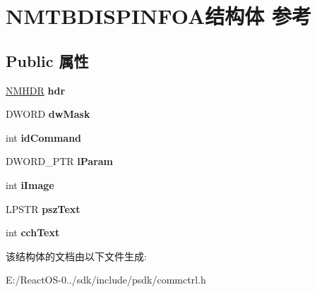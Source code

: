 \hypertarget{struct_n_m_t_b_d_i_s_p_i_n_f_o_a}{}\section{N\+M\+T\+B\+D\+I\+S\+P\+I\+N\+F\+O\+A结构体 参考}
\label{struct_n_m_t_b_d_i_s_p_i_n_f_o_a}
\subsection*{Public 属性}
\begin{DoxyCompactItemize}
\item 
\mbox{\label{struct_n_m_t_b_d_i_s_p_i_n_f_o_a_aab2fefe9cd6b92ec7bbbc17f71eddcc4}} 
\hyperlink{structtag_n_m_h_d_r}{N\+M\+H\+DR} {\bfseries hdr}
\item 
\mbox{\label{struct_n_m_t_b_d_i_s_p_i_n_f_o_a_a1a639f58fac80df2aa862d0d7d12638f}} 
D\+W\+O\+RD {\bfseries dw\+Mask}
\item 
\mbox{\label{struct_n_m_t_b_d_i_s_p_i_n_f_o_a_afd887f41e3255df88edcc1c6bb26b526}} 
int {\bfseries id\+Command}
\item 
\mbox{\label{struct_n_m_t_b_d_i_s_p_i_n_f_o_a_ad8b6ea3d08d44fa542a4dd84e0efb99d}} 
D\+W\+O\+R\+D\+\_\+\+P\+TR {\bfseries l\+Param}
\item 
\mbox{\label{struct_n_m_t_b_d_i_s_p_i_n_f_o_a_a2a36e82b3c85767238955692dcd6d0ca}} 
int {\bfseries i\+Image}
\item 
\mbox{\label{struct_n_m_t_b_d_i_s_p_i_n_f_o_a_a7e8319a443ef190d0d0f2beddc739541}} 
L\+P\+S\+TR {\bfseries psz\+Text}
\item 
\mbox{\label{struct_n_m_t_b_d_i_s_p_i_n_f_o_a_a59261125204b1410ac057169d21a3cef}} 
int {\bfseries cch\+Text}
\end{DoxyCompactItemize}


该结构体的文档由以下文件生成\+:\begin{DoxyCompactItemize}
\item 
E\+:/\+React\+O\+S-\/0../sdk/include/psdk/commctrl.\+h\end{DoxyCompactItemize}
